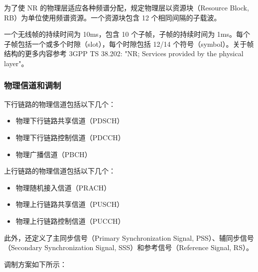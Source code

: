 \documentclass[cn,hazy,blue,14pt,screen,device=normal]{elegantnote}
\begin{document}
为了使 NR 的物理层适应各种频谱分配，规定物理层以资源块（Resource Block, RB）为单位使用频谱资源。一个资源块包含 12 个相同间隔的子载波。

一个无线帧的持续时间为 10ms，包含 10 个子帧，子帧的持续时间为 1ms。每个子帧包括一个或多个时隙（slot），每个时隙包括 12/14 个符号（symbol）。关于帧结构的更多内容参考 3GPP TS 38.202: "NR; Services provided by the physical layer"。

\subsubsection{物理信道和调制}
下行链路的物理信道包括以下几个：

\begin{itemize}[leftmargin=2cm]
	\item 物理下行链路共享信道（PDSCH）
	\item 物理下行链路控制信道（PDCCH）
	\item 物理广播信道（PBCH）
\end{itemize}

上行链路的物理信道包括以下几个：
\begin{itemize}[leftmargin=2cm]
	\item 物理随机接入信道（PRACH）
	\item 物理上行链路共享信道（PUSCH）
	\item 物理上行链路控制信道（PUCCH）
\end{itemize}

此外，还定义了主同步信号（Primary Synchronization Signal, PSS）、辅同步信号（Secondary Synchronization Signal, SSS）和参考信号（Reference Signal, RS）。

调制方案如下所示：

\begin{table}[!hbp]
	\caption{调制方案}
	\label{modulation}
\end{table}
\end{document}
